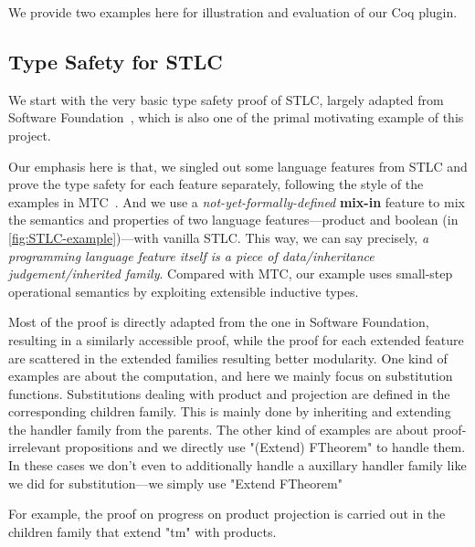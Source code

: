 We provide two examples here for illustration and evaluation of our Coq plugin. 

\subsection{Type Safety for STLC}
We start with the very basic type safety proof of STLC, largely adapted
from Software Foundation~\cite{pierce2014software}, which is also one of
the primal motivating example of this project. 

Our emphasis here is that, we singled out some language features from
STLC and prove the type safety for each feature separately, following
the style of the examples in MTC~\cite{delaware2013,forsta2020}.
And we use a \textit{not-yet-formally-defined} \textbf{mix-in} feature
to mix the semantics and properties of two language features---product
and boolean (in \cref{fig:STLC-example})---with vanilla STLC. This way,
we can say precisely, \textit{a programming language feature itself is a
piece of data/inheritance judgement/inherited family}. Compared with MTC,
our example uses small-step operational semantics by exploiting
extensible inductive types. 

Most of the proof is directly adapted
from the one in Software Foundation, resulting in a similarly accessible proof, while the proof for each extended feature are scattered in the extended families resulting better modularity. One kind of examples are about the computation, and here we mainly focus on substitution functions. Substitutions dealing with product and projection are defined in the corresponding children family. This is mainly done by inheriting and extending the handler family from the parents. The other kind of examples are about proof-irrelevant propositions and we directly use "(Extend) FTheorem" to handle them. In these cases we don't even to additionally handle a auxillary handler family like we did for substitution---we simply use "Extend FTheorem" 

For example, the proof on progress on product projection is carried out in the children family that extend "tm" with products. 


